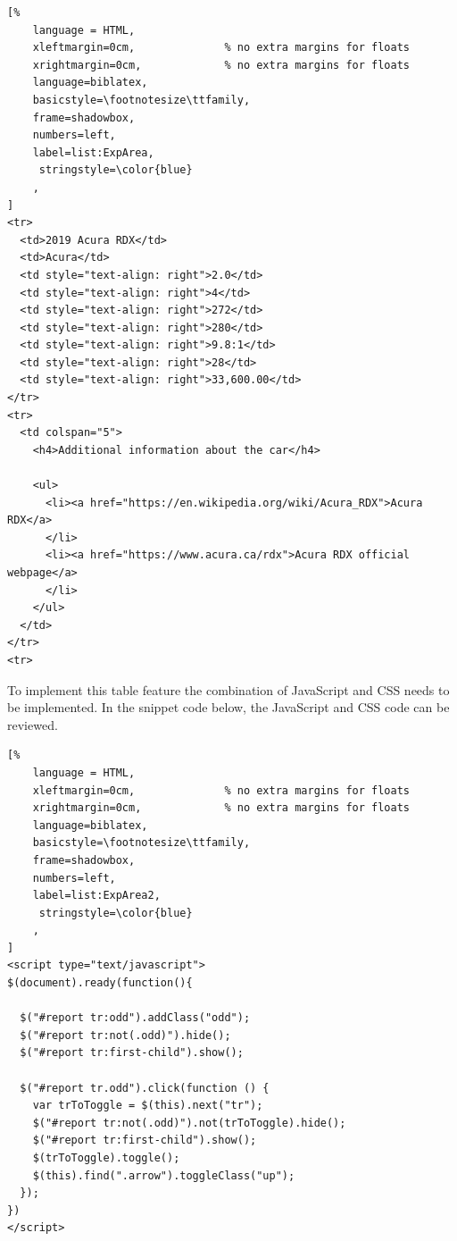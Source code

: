 \begin{lstlisting}[%
    language = HTML,
    xleftmargin=0cm,              % no extra margins for floats
    xrightmargin=0cm,             % no extra margins for floats
    language=biblatex,
    basicstyle=\footnotesize\ttfamily,
    frame=shadowbox,
    numbers=left,
    label=list:ExpArea,
     stringstyle=\color{blue}
    ,
]
<tr>
  <td>2019 Acura RDX</td>
  <td>Acura</td>
  <td style="text-align: right">2.0</td>
  <td style="text-align: right">4</td>
  <td style="text-align: right">272</td>
  <td style="text-align: right">280</td>
  <td style="text-align: right">9.8:1</td>
  <td style="text-align: right">28</td>
  <td style="text-align: right">33,600.00</td>
</tr>
<tr>
  <td colspan="5">
    <h4>Additional information about the car</h4>

    <ul>
      <li><a href="https://en.wikipedia.org/wiki/Acura_RDX">Acura RDX</a>
      </li>
      <li><a href="https://www.acura.ca/rdx">Acura RDX official webpage</a>
      </li>
    </ul>
  </td>
</tr>
<tr>
\end{lstlisting}
To implement this table feature the combination of JavaScript and CSS
needs to be implemented. In the snippet code below, the JavaScript and
CSS code can be reviewed.

\begin{lstlisting}[%
    language = HTML,
    xleftmargin=0cm,              % no extra margins for floats
    xrightmargin=0cm,             % no extra margins for floats
    language=biblatex,
    basicstyle=\footnotesize\ttfamily,
    frame=shadowbox,
    numbers=left,
    label=list:ExpArea2,
     stringstyle=\color{blue}
    ,
]
<script type="text/javascript">
$(document).ready(function(){

  $("#report tr:odd").addClass("odd");
  $("#report tr:not(.odd)").hide();
  $("#report tr:first-child").show();

  $("#report tr.odd").click(function () {
    var trToToggle = $(this).next("tr");
    $("#report tr:not(.odd)").not(trToToggle).hide();
    $("#report tr:first-child").show();
    $(trToToggle).toggle();
    $(this).find(".arrow").toggleClass("up");
  });
})
</script>

\end{lstlisting}

